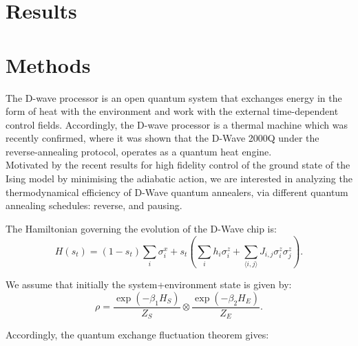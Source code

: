 \documentclass[default,iicol]{sn-jnl}%
\theoremstyle{thmstyleone}%
\theoremstyle{thmstyletwo}%
\theoremstyle{thmstylethree}%
\begin{document}
\section{Results}\label{sec2}


\section{Methods}\label{sec3}
The D-wave processor is an open quantum system that exchanges energy in the form of heat with the environment and work with the external time-dependent control fields. Accordingly, the D-wave processor is a thermal machine which was recently confirmed,  where it was shown that the D-Wave 2000Q under the reverse-annealing protocol, operates as a quantum heat engine.  \\
Motivated by the recent results for high fidelity control of the ground state of the Ising model by minimising the adiabatic action, we are interested in analyzing the thermodynamical efficiency of D-Wave quantum annealers, via different quantum annealing schedules: reverse, and pausing. 

The Hamiltonian governing the evolution of the D-Wave chip is:
\begin{equation}
    H(s_t)=(1-s_t)\sum_i \sigma_i^x + s_t \left( \sum_i h_i \sigma_i^z + \sum_{\langle i,j \rangle} J_{i,j} \sigma_i^z \sigma_j^z \right).
    \label{ham}
\end{equation}

We assume that initially the system+environment state is given by:
\begin{equation}
    \rho=\frac{\exp{(-\beta_1 H_S)}}{Z_S} \otimes \frac{\exp{(-\beta_2 H_E)}}{Z_E}.
\end{equation}

Accordingly, the quantum exchange fluctuation theorem gives:
\end{document}
